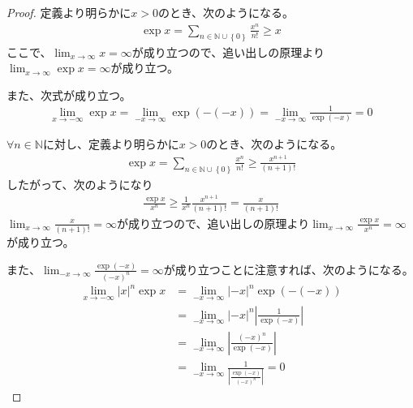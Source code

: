 \documentclass[dvipdfmx]{jsarticle}
\begin{document}
\begin{proof} 定義より明らかに$x > 0$のとき、次のようになる。
\begin{align*}
\exp x = \sum_{n \in \mathbb{N} \cup \left\{ 0 \right\}} \frac{x^{n}}{n!} \geq x
\end{align*}
ここで、$\lim_{x \rightarrow \infty}x = \infty$が成り立つので、追い出しの原理より$\lim_{x \rightarrow \infty}{\exp x} = \infty$が成り立つ。\par
また、次式が成り立つ。
\begin{align*}
\lim_{x \rightarrow - \infty}{\exp x} = \lim_{- x \rightarrow \infty}{\exp\left( - ( - x) \right)} = \lim_{- x \rightarrow \infty}\frac{1}{\exp( - x)} = 0
\end{align*}\par
$\forall n \in \mathbb{N}$に対し、定義より明らかに$x > 0$のとき、次のようになる。
\begin{align*}
\exp x = \sum_{n \in \mathbb{N} \cup \left\{ 0 \right\}} \frac{x^{n}}{n!} \geq \frac{x^{n + 1}}{(n + 1)!}
\end{align*}
したがって、次のようになり
\begin{align*}
\frac{\exp x}{x^{n}} \geq \frac{1}{x^{n}}\frac{x^{n + 1}}{(n + 1)!} = \frac{x}{(n + 1)!}
\end{align*}
$\lim_{x \rightarrow \infty}\frac{x}{(n + 1)!} = \infty$が成り立つので、追い出しの原理より$\lim_{x \rightarrow \infty}\frac{\exp x}{x^{n}} = \infty$が成り立つ。\par
また、$\lim_{- x \rightarrow \infty}\frac{\exp( - x)}{( - x)^{n}} = \infty$が成り立つことに注意すれば、次のようになる。
\begin{align*}
\lim_{x \rightarrow - \infty}{|x|^{n}\exp x} &= \lim_{- x \rightarrow \infty}{| - x|^{n}\exp\left( - ( - x) \right)}\\
&= \lim_{- x \rightarrow \infty}{| - x|^{n}\left| \frac{1}{\exp( - x)} \right|}\\
&= \lim_{- x \rightarrow \infty}\left| \frac{( - x)^{n}}{\exp( - x)} \right|\\
&= \lim_{- x \rightarrow \infty}\frac{1}{\left| \frac{\exp( - x)}{( - x)^{n}} \right|} = 0
\end{align*}
\end{proof}
\end{document}
